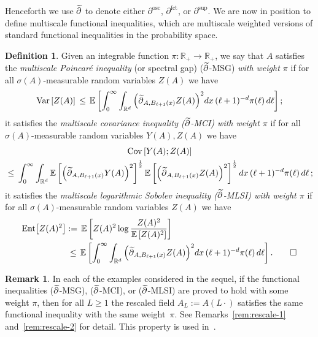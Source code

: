 \documentclass[10pt]{amsart}
\theoremstyle{definition}\newtheorem{defi}[theo]{Definition}\newtheorem{rema}[theo]{Remark}\newtheorem{exam}[theo]{Example}\newtheorem{exem}[theo]{Example}\newtheorem{nota}[theo]{Notation}
\newcommand{\R}{\mathbb R}
\newcommand{\expec}[1]{\mathbb{E}\left[#1 \right]}
\newcommand{\parfct}[1]{\partial_{#1}^{\operatorname{fct}}}
\newcommand{\parsup}[1]{\partial_{#1}^{\operatorname{\sup}}}
\newcommand{\osc}{\partial^{\mathrm{osc}}}
\newcommand{\var}[1]{\mathrm{Var}\left[#1\right]}
\newcommand{\ent}[1]{\mathrm{Ent}\!\left[#1\right]}
\newcommand{\cov}[2]{\mathrm{Cov}\left[#1;#2\right]}
\let\oldtilde\tilde
\renewcommand*{\tilde}[1]{\mathchoice{\widetilde{#1}}{\widetilde{#1}}{\oldtilde{#1}}{\oldtilde{#1}}}\let\oldhat\hat
\renewcommand*{\hat}[1]{\mathchoice{\widehat{#1}}{\widehat{#1}}{\oldhat{#1}}{\oldhat{#1}}}\let\oldexists\exists
\renewcommand*{\exists}{\mathrel{\oldexists}}
\begin{document}
Henceforth we use $\tilde\partial$ to denote either $\osc$, $\parfct{}$, or $\parsup{}$. We are now in position to define multiscale functional inequalities, which are multiscale weighted versions of standard functional inequalities in the probability space.
\begin{defi}\label{defi:TFI}
Given an integrable function $\pi:\R_+\to\R_+$, we say that $A$ satisfies the \emph{multiscale Poincaré inequality} (or spectral gap) ($\tilde \partial$-MSG) \emph{with weight $\pi$} if for all $\sigma(A)$-measurable random variables $Z(A)$ we have
\begin{align*}
\var{Z(A)}\,\le \,\expec{\int_0^\infty \int_{\R^d}\Big(\tilde\partial_{A,B_{\ell+1}(x)}Z(A)\Big)^{2}dx\,(\ell+1)^{-d}\pi(\ell)\,d\ell};
\end{align*}
it satisfies the \emph{multiscale covariance inequality \emph{($\tilde\partial$-MCI)} with weight $\pi$} if for all $\sigma(A)$-measurable random variables $Y(A),Z(A)$ we have
\begin{multline*}
\cov{Y(A)}{Z(A)}\\
\,\le\, \int_0^\infty \int_{\R^d}\expec{\Big(\tilde\partial_{A,B_{\ell+1}(x)}Y(A)\Big)^2}^{\frac12}\expec{\Big(\tilde\partial_{A,B_{\ell+1}(x)}Z(A)\Big)^2}^{\frac12}dx \,(\ell+1)^{-d}\pi(\ell)\,d\ell\,;
\end{multline*}
it satisfies the \emph{multiscale logarithmic Sobolev inequality \emph{($\tilde\partial$-MLSI)} with weight $\pi$} if for all $\sigma(A)$-measurable random variables $Z(A)$ we have
\begin{align*}
\ent{Z(A)^2}&:=\,\expec{Z(A)^2\log\frac{Z(A)^2}{\expec{Z(A)^2}}}\\
&\,\le\,\expec{\int_0^\infty \int_{\R^d}\Big(\tilde\partial_{A,B_{\ell+1}(x)}Z(A)\Big)^{2}dx\,(\ell+1)^{-d}\pi(\ell)\,d\ell}.\qedhere
\end{align*}
\end{defi}

\begin{rema}\label{rem:proofplus}
In each of the examples considered in the sequel, if the functional inequalities ($\tilde\partial$-MSG), ($\tilde\partial$-MCI), or ($\tilde\partial$-MLSI) are proved to hold with some weight $\pi$, then for all $L\ge1$ the rescaled field $A_L:=A(L\cdot)$ satisfies the same functional inequality with the same weight~$\pi$. See Remarks~\ref{rem:rescale-1} and~\ref{rem:rescale-2} for detail. This property is used in~\cite{GNO-reg}.
\end{rema}
\end{document}
